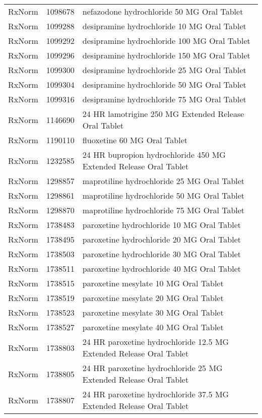 \begin{longtable}{p{}p{}p{}}
  RxNorm & 1098678 & nefazodone hydrochloride 50 MG Oral Tablet \\ 
  RxNorm & 1099288 & desipramine hydrochloride 10 MG Oral Tablet \\ 
  RxNorm & 1099292 & desipramine hydrochloride 100 MG Oral Tablet \\ 
  RxNorm & 1099296 & desipramine hydrochloride 150 MG Oral Tablet \\ 
  RxNorm & 1099300 & desipramine hydrochloride 25 MG Oral Tablet \\ 
  RxNorm & 1099304 & desipramine hydrochloride 50 MG Oral Tablet \\ 
  RxNorm & 1099316 & desipramine hydrochloride 75 MG Oral Tablet \\ 
  RxNorm & 1146690 & 24 HR lamotrigine 250 MG Extended Release Oral Tablet \\ 
  RxNorm & 1190110 & fluoxetine 60 MG Oral Tablet \\ 
  RxNorm & 1232585 & 24 HR bupropion hydrochloride 450 MG Extended Release Oral Tablet \\ 
  RxNorm & 1298857 & maprotiline hydrochloride 25 MG Oral Tablet \\ 
  RxNorm & 1298861 & maprotiline hydrochloride 50 MG Oral Tablet \\ 
  RxNorm & 1298870 & maprotiline hydrochloride 75 MG Oral Tablet \\ 
  RxNorm & 1738483 & paroxetine hydrochloride 10 MG Oral Tablet \\ 
  RxNorm & 1738495 & paroxetine hydrochloride 20 MG Oral Tablet \\ 
  RxNorm & 1738503 & paroxetine hydrochloride 30 MG Oral Tablet \\ 
  RxNorm & 1738511 & paroxetine hydrochloride 40 MG Oral Tablet \\ 
  RxNorm & 1738515 & paroxetine mesylate 10 MG Oral Tablet \\ 
  RxNorm & 1738519 & paroxetine mesylate 20 MG Oral Tablet \\ 
  RxNorm & 1738523 & paroxetine mesylate 30 MG Oral Tablet \\ 
  RxNorm & 1738527 & paroxetine mesylate 40 MG Oral Tablet \\ 
  RxNorm & 1738803 & 24 HR paroxetine hydrochloride 12.5 MG Extended Release Oral Tablet \\ 
  RxNorm & 1738805 & 24 HR paroxetine hydrochloride 25 MG Extended Release Oral Tablet \\ 
  RxNorm & 1738807 & 24 HR paroxetine hydrochloride 37.5 MG Extended Release Oral Tablet \\ 

\end{longtable}
